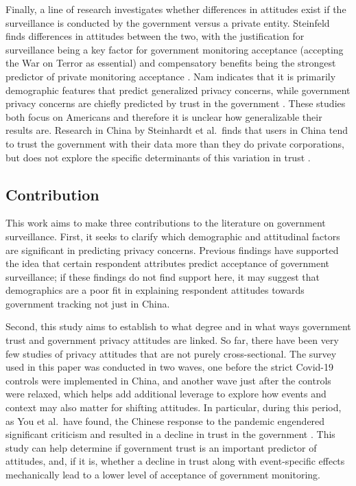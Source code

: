 \documentclass[
  number]{elsarticle}
\begin{document}
Finally, a line of research investigates whether differences in
attitudes exist if the surveillance is conducted by the government
versus a private entity. Steinfeld finds differences in attitudes
between the two, with the justification for surveillance being a key
factor for government monitoring acceptance (accepting the War on Terror
as essential) and compensatory benefits being the strongest predictor of
private monitoring acceptance \citep{steinfeld2017}. Nam indicates that
it is primarily demographic features that predict generalized privacy
concerns, while government privacy concerns are chiefly predicted by
trust in the government \citep{nam2019}. These studies both focus on
Americans and therefore it is unclear how generalizable their results
are. Research in China by Steinhardt et al.~finds that users in China
tend to trust the government with their data more than they do private
corporations, but does not explore the specific determinants of this
variation in trust \citep{steinhardt2022}.

\subsection{Contribution}\label{contribution}

This work aims to make three contributions to the literature on
government surveillance. First, it seeks to clarify which demographic
and attitudinal factors are significant in predicting privacy concerns.
Previous findings have supported the idea that certain respondent
attributes predict acceptance of government surveillance; if these
findings do not find support here, it may suggest that demographics are
a poor fit in explaining respondent attitudes towards government
tracking not just in China.

Second, this study aims to establish to what degree and in what ways
government trust and government privacy attitudes are linked. So far,
there have been very few studies of privacy attitudes that are not
purely cross-sectional. The survey used in this paper was conducted in
two waves, one before the strict Covid-19 controls were implemented in
China, and another wave just after the controls were relaxed, which
helps add additional leverage to explore how events and context may also
matter for shifting attitudes. In particular, during this period, as You
et al.~have found, the Chinese response to the pandemic engendered
significant criticism and resulted in a decline in trust in the
government \citep{you2024}. This study can help determine if government
trust is an important predictor of attitudes, and, if it is, whether a
decline in trust along with event-specific effects mechanically lead to
a lower level of acceptance of government monitoring.
\end{document}
